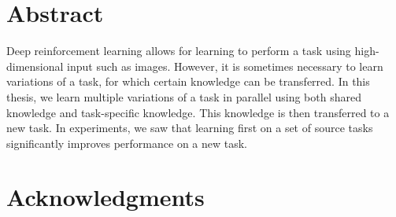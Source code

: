 \documentclass[11pt, a4paper, titlepage, twoside, openright]{book}
\numberwithin{equation}{section}
\providecommand{\keywords}[1]{\textbf{\textit{Index terms---}} #1}
\begin{document}
\frontmatter
\hypersetup{pageanchor=false}

\hypersetup{pageanchor=true}
\setcounter{page}{1}
\chapter*{Abstract}
Deep reinforcement learning allows for learning to perform a task using high-dimensional input such as images. However, it is sometimes necessary to learn variations of a task, for which certain knowledge can be transferred. In this thesis, we learn multiple variations of a task in parallel using both shared knowledge and task-specific knowledge. This knowledge is then transferred to a new task. In experiments, we saw that learning first on a set of source tasks significantly improves performance on a new task.

\chapter*{Acknowledgments}


\tableofcontents

\listoffigures
\listofalgorithms
\listoftables

\mainmatter










\backmatter


\printbibliography
\end{document}
